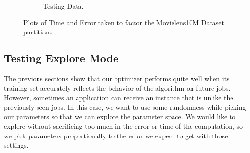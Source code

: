 \begin{figure}
\begin{subfigure}[b]{.45\textwidth}
\begin{center}
		\caption{Testing Data. }
\end{center}
	\end{subfigure}
\hfill
	\caption{Plots of Time and Error taken to factor the Movielens10M Dataset partitions.}	
\end{figure}

\subsection{Testing Explore Mode}
The previous sections show that our optimizer performs quite well when its training set accurately reflects the behavior of the algorithm on future jobs. However, sometimes an application can receive an instance that is unlike the previously seen jobs. In this case, we want to use some randomness while picking our parameters so that we can explore the parameter space. We would like to explore without sacrificing too much in the error or time of the computation, so we pick parameters proportionally to the error we expect to get with those settings. 
